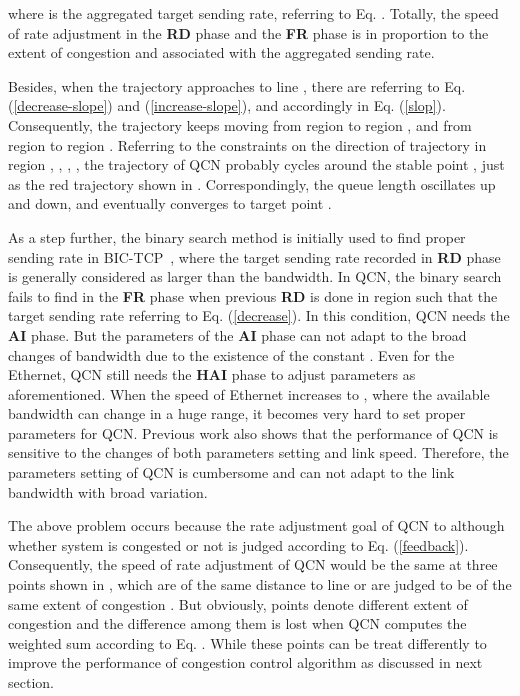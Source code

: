 \documentclass{sig-alternate-10pt}
\begin{document}
where  is the aggregated target sending rate, referring to Eq. . Totally, the speed of rate adjustment in the \textbf{RD} phase and the \textbf{FR} phase is in proportion to the extent of congestion  and associated with the aggregated sending rate.

Besides, when the trajectory approaches to line , there are  referring to Eq. (\ref{decrease-slope}) and (\ref{increase-slope}), and accordingly  in Eq. (\ref{slop}). Consequently, the trajectory keeps moving from region  to region , and from region  to region . Referring to the constraints on the direction of trajectory in region , , , , the trajectory of QCN probably cycles around the stable point , just as the red trajectory shown in . Correspondingly, the queue length oscillates up and down, and eventually converges to target point .

As a step further, the binary search method is initially used to find proper sending rate  in BIC-TCP~\cite{BIC}, where the target sending rate recorded in \textbf{RD} phase is generally considered as larger than the bandwidth. In QCN, the binary search fails to find  in the \textbf{FR} phase when previous \textbf{RD} is done in region  such that the target sending rate  referring to Eq. (\ref{decrease}). In this condition, QCN needs the \textbf{AI} phase. But the parameters of the  \textbf{AI} phase can not adapt to the broad changes of bandwidth due to the existence of the constant . Even for the  Ethernet, QCN still needs the \textbf{HAI} phase to adjust parameters as aforementioned. When the speed of Ethernet increases to , where the available bandwidth can change in a huge range, it becomes very hard to set proper parameters for QCN. Previous work  also shows that the performance of QCN is sensitive to the changes of both parameters setting and link speed. Therefore, the parameters setting of QCN is cumbersome and can not adapt to the link bandwidth with broad variation. 

The above problem occurs because the rate adjustment goal of QCN to  although whether system is congested or not is judged according to Eq. (\ref{feedback}). Consequently, the speed of rate adjustment of QCN would be the same at three points  shown in , which are of the same distance to line  or are judged to be of the same extent of congestion . But obviously, points  denote different extent of congestion and the difference among them is lost when QCN computes the weighted sum according to Eq. . While these points can be treat differently to improve the performance of congestion control algorithm as discussed in next section. 
\end{document}
